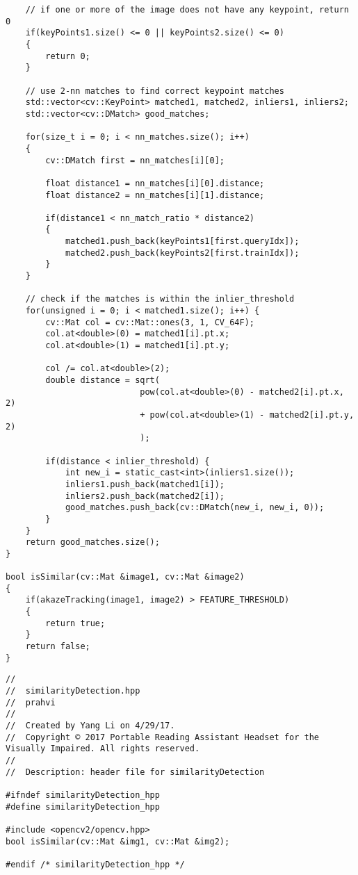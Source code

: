 \begin{lstlisting}
	// if one or more of the image does not have any keypoint, return 0
	if(keyPoints1.size() <= 0 || keyPoints2.size() <= 0)
	{
		return 0;
	}
	
	// use 2-nn matches to find correct keypoint matches
	std::vector<cv::KeyPoint> matched1, matched2, inliers1, inliers2;
	std::vector<cv::DMatch> good_matches;
	
	for(size_t i = 0; i < nn_matches.size(); i++)
	{
		cv::DMatch first = nn_matches[i][0];
		
		float distance1 = nn_matches[i][0].distance;
		float distance2 = nn_matches[i][1].distance;
		
		if(distance1 < nn_match_ratio * distance2)
		{
			matched1.push_back(keyPoints1[first.queryIdx]);
			matched2.push_back(keyPoints2[first.trainIdx]);
		}
	}
	
	// check if the matches is within the inlier_threshold
	for(unsigned i = 0; i < matched1.size(); i++) {
		cv::Mat col = cv::Mat::ones(3, 1, CV_64F);
		col.at<double>(0) = matched1[i].pt.x;
		col.at<double>(1) = matched1[i].pt.y;
		
		col /= col.at<double>(2);
		double distance = sqrt(
						   pow(col.at<double>(0) - matched2[i].pt.x, 2)
						   + pow(col.at<double>(1) - matched2[i].pt.y, 2)
						   );
		
		if(distance < inlier_threshold) {
			int new_i = static_cast<int>(inliers1.size());
			inliers1.push_back(matched1[i]);
			inliers2.push_back(matched2[i]);
			good_matches.push_back(cv::DMatch(new_i, new_i, 0));
		}
	}
	return good_matches.size();
}

bool isSimilar(cv::Mat &image1, cv::Mat &image2)
{
	if(akazeTracking(image1, image2) > FEATURE_THRESHOLD)
	{
		return true;
	}
	return false;
}

\end{lstlisting}

\begin{lstlisting}
//
//  similarityDetection.hpp
//  prahvi
//
//  Created by Yang Li on 4/29/17.
//  Copyright © 2017 Portable Reading Assistant Headset for the Visually Impaired. All rights reserved.
//
//	Description: header file for similarityDetection

#ifndef similarityDetection_hpp
#define similarityDetection_hpp

#include <opencv2/opencv.hpp>
bool isSimilar(cv::Mat &img1, cv::Mat &img2);

#endif /* similarityDetection_hpp */

\end{lstlisting}


